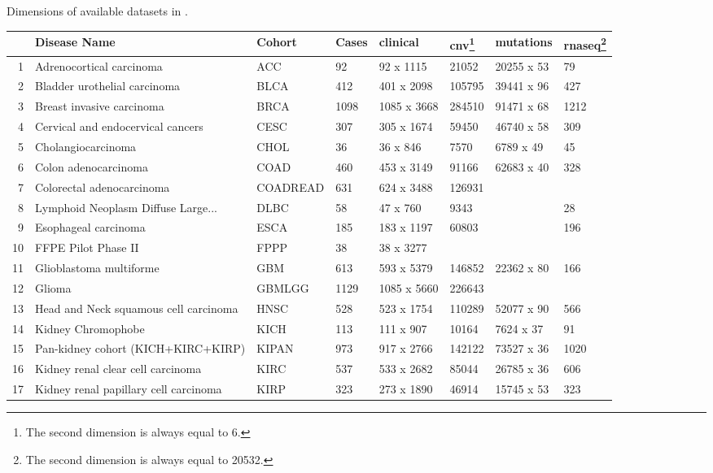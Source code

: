 \begin{widetable}[h]
\centering
\caption{\label{data_details}Dimensions of available datasets in .}
\begin{tabular}{rlllllll}
  \toprule
 & Disease Name & Cohort & Cases & clinical & cnv\footnote{The second dimension is always equal to 6.} & mutations & rnaseq\footnote{The second dimension is always equal to 20532.} \\ 
  \toprule
1 & Adrenocortical carcinoma & ACC & 92 & 92 x 1115 & 21052 & 20255 x 53 & 79 \\ 
  2 & Bladder urothelial carcinoma & BLCA & 412 & 401 x 2098 & 105795 & 39441 x 96 & 427 \\ 
  3 & Breast invasive carcinoma & BRCA & 1098 & 1085 x 3668 & 284510 & 91471 x 68 & 1212 \\ 
  4 & Cervical and endocervical cancers & CESC & 307 & 305 x 1674 & 59450 & 46740 x 58 & 309 \\ 
  5 & Cholangiocarcinoma & CHOL & 36 & 36 x 846 & 7570 & 6789 x 49 & 45 \\ 
  6 & Colon adenocarcinoma & COAD & 460 & 453 x 3149 & 91166 & 62683 x 40 & 328 \\ 
  7 & Colorectal adenocarcinoma & COADREAD & 631 & 624 x 3488 & 126931 &  &  \\ 
  8 & Lymphoid Neoplasm Diffuse Large... & DLBC & 58 & 47 x 760 & 9343 &  & 28 \\ 
  9 & Esophageal carcinoma & ESCA & 185 & 183 x 1197 & 60803 &  & 196 \\ 
  10 & FFPE Pilot Phase II & FPPP & 38 & 38 x 3277 &  &  &  \\ 
  11 & Glioblastoma multiforme & GBM & 613 & 593 x 5379 & 146852 & 22362 x 80 & 166 \\ 
  12 & Glioma & GBMLGG & 1129 & 1085 x 5660 & 226643 &  &  \\ 
  13 & Head and Neck squamous cell carcinoma & HNSC & 528 & 523 x 1754 & 110289 & 52077 x 90 & 566 \\ 
  14 & Kidney Chromophobe & KICH & 113 & 111 x 907 & 10164 & 7624 x 37 & 91 \\ 
  15 & Pan-kidney cohort (KICH+KIRC+KIRP) & KIPAN & 973 & 917 x 2766 & 142122 & 73527 x 36 & 1020 \\ 
  16 & Kidney renal clear cell carcinoma & KIRC & 537 & 533 x 2682 & 85044 & 26785 x 36 & 606 \\ 
  17 & Kidney renal papillary cell carcinoma & KIRP & 323 & 273 x 1890 & 46914 & 15745 x 53 & 323 \\ 

\end{tabular}
\end{widetable}
